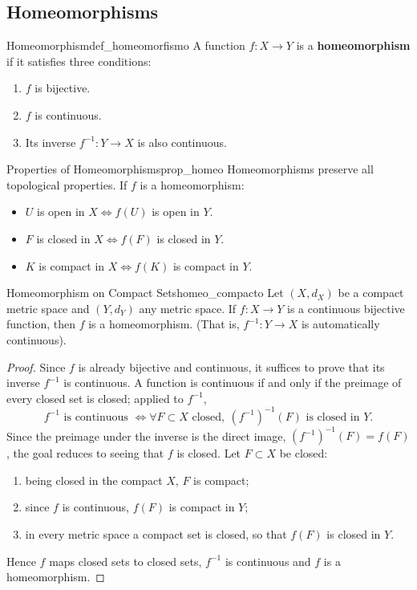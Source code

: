 \documentclass[11pt, a4paper]{article}
\begin{document}
\subsection{Homeomorphisms}

\begin{definicion}{Homeomorphism}{def_homeomorfismo}
A function $f: X \to Y$ is a \textbf{homeomorphism} if it satisfies three conditions:
\begin{enumerate}
    \item $f$ is bijective.
    \item $f$ is continuous.
    \item Its inverse $f^{-1}: Y \to X$ is also continuous.
\end{enumerate}
\end{definicion}

\begin{proposicion}{Properties of Homeomorphisms}{prop_homeo}
Homeomorphisms preserve all topological properties. If $f$ is a homeomorphism:
\begin{itemize}
    \item $U$ is open in $X \iff f(U)$ is open in $Y$.
    \item $F$ is closed in $X \iff f(F)$ is closed in $Y$.
    \item $K$ is compact in $X \iff f(K)$ is compact in $Y$.
\end{itemize}
\end{proposicion}

\begin{teorema}{Homeomorphism on Compact Sets}{homeo_compacto}
Let $(X, d_X)$ be a compact metric space and $(Y, d_Y)$ any metric space.
If $f: X \to Y$ is a continuous bijective function, then $f$ is a homeomorphism.
(That is, $f^{-1}: Y \to X$ is automatically continuous).
\end{teorema}

\begin{proof}
Since $f$ is already bijective and continuous, it suffices to prove that its inverse $f^{-1}$ is continuous. A function
is continuous if and only if the preimage of every closed set is closed; applied to $f^{-1}$,
$$ f^{-1} \text{ is continuous } \iff \forall F \subset X \text{ closed}, \ (f^{-1})^{-1}(F)
\text{ is closed in } Y. $$
Since the preimage under the inverse is the direct image, $(f^{-1})^{-1}(F) = f(F)$, the goal
reduces to seeing that $f$ is closed. Let $F \subset X$ be closed:
\begin{enumerate}
    \item being closed in the compact $X$, $F$ is compact;
    \item since $f$ is continuous, $f(F)$ is compact in $Y$;
    \item in every metric space a compact set is closed, so that $f(F)$ is closed in $Y$.
\end{enumerate}
Hence $f$ maps closed sets to closed sets, $f^{-1}$ is continuous and $f$ is a homeomorphism.
\end{proof}
\end{document}

